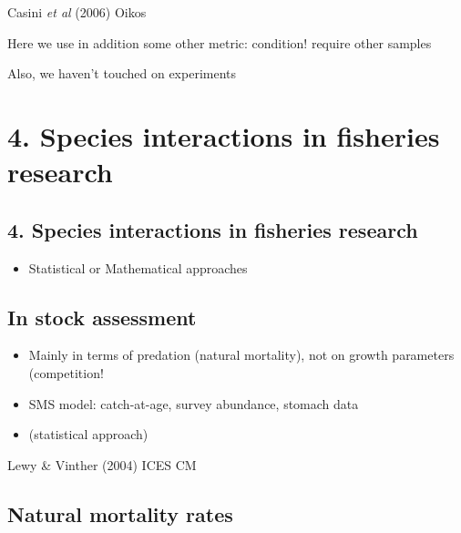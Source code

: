 \documentclass[
  letterpaper,
  DIV=11,
  numbers=noendperiod]{scrartcl}
\providecommand{\tightlist}{%
  \setlength{\itemsep}{0pt}\setlength{\parskip}{0pt}}\usepackage{longtable,booktabs,array}
\begin{document}
Casini \emph{et al} (2006) Oikos

Here we use in addition some other metric: condition! require other
samples

Also, we haven't touched on experiments

\hypertarget{species-interactions-in-fisheries-research}{%
\section{4. Species interactions in fisheries
research}\label{species-interactions-in-fisheries-research}}

\hypertarget{species-interactions-in-fisheries-research-1}{%
\subsection{4. Species interactions in fisheries
research}\label{species-interactions-in-fisheries-research-1}}

\begin{itemize}
\tightlist
\item
  Statistical or Mathematical approaches
\end{itemize}

\hypertarget{in-stock-assessment}{%
\subsection{In stock assessment}\label{in-stock-assessment}}

\begin{itemize}
\item
  Mainly in terms of predation (natural mortality), not on growth
  parameters (competition!
\item
  SMS model: catch-at-age, survey abundance, stomach data
\item
  (statistical approach)
\end{itemize}

Lewy \& Vinther (2004) ICES CM

\hypertarget{natural-mortality-rates}{%
\subsection{Natural mortality rates}\label{natural-mortality-rates}}
\end{document}
